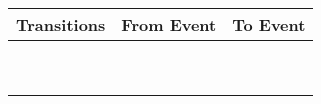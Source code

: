 \setlength{\firstcol}{2cm}
\setlength{\secondcol}{0.75cm}
\setlength{\thirdcol}{3.7cm}
\setlength{\fourthcol}{6cm}
\setlength{\fifthcol}{6cm}

\begin{table}[htp]
\centering

\begin{tabular}{|c|c|c|}
\hline
\textbf{Transitions} & \textbf{From Event} & 
\textbf{To Event} \\
\hline
   &  & \\ \cline{1-3}
   &  & \\ \cline{1-3}
   &  & \\ \cline{1-3}
   &  & \\ \cline{1-3}
   &  & \\ \cline{1-3}
   &  & \\ \cline{1-3}
   &  & \\ \cline{1-3}
   &  & \\ \cline{1-3}
   &  & \\ \hline 
 \end{tabular}%
\end{table}
